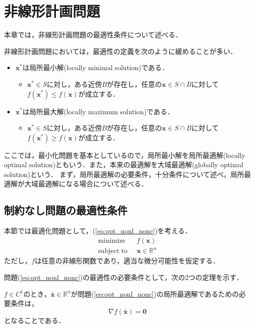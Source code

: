 \documentclass{jsreport}
\begin{document}
\chapter{非線形計画問題}
本章では，非線形計画問題の最適性条件について述べる．

非線形計画問題においては，最適性の定義を次のように緩めることが多い．
\begin{itemize}
  \item $\bm{x}^*$は局所最小解(locally minimal solution)である．
  \begin{itemize}
    \item $\bm{x}^* \in S$に対し，ある近傍$B$が存在し，任意の$\bm{x} \in S \cap B$に対して$f(\bm{x}^*) \leq f(\bm{x})$が成立する．
  \end{itemize}
  \item $\bm{x}^*$は局所最大解(locally maximum solution)である．
  \begin{itemize}
    \item $\bm{x}^* \in S$に対し，ある近傍$B$が存在し，任意の$\bm{x} \in S \cap B$に対して$f(\bm{x}^*) \geq f(\bm{x})$が成立する．
  \end{itemize}
\end{itemize}

ここでは，最小化問題を基本としているので，局所最小解を局所最適解(locally optimal solution)ともいう．また，本来の最適解を大域最適解(globally optimal solution)という．
まず，局所最適解の必要条件，十分条件について述べ，局所最適解が大域最適解になる場合について述べる．

\section{制約なし問題の最適性条件}
本節では最適化問題として，(\ref{eq:opt_nonl_nonc})を考える．
\begin{align}\label{eq:opt_nonl_nonc}
  \mathrm{minimize} \; \; &f(\bm{x}) \nonumber\\
  \mathrm{subject \; to} \; \; &\bm{x} \in \mathbb{R}^n
\end{align}
ただし，$f$は任意の非線形関数であり，適当な微分可能性を仮定する．

問題(\ref{eq:opt_nonl_nonc})の最適性の必要条件として，次の2つの定理を示す．
\begin{theo}\label{theo:opt_nonl_nonc_h_1}
  $f \in C^{1}$のとき，$\bar{\bm{x}} \in \mathbb{R}^n$が問題(\ref{eq:opt_nonl_nonc})の局所最適解であるための必要条件は，
  \begin{equation}
    \nabla f(\bar{\bm{x}}) = \bm{0} \nonumber
  \end{equation}
  となることである．
\end{theo}
\end{document}
